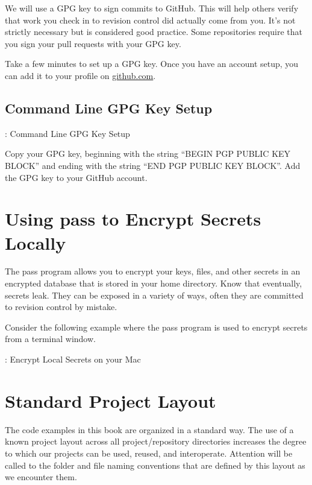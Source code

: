 \justify{}
We will use a GPG key to sign commits to GitHub. This will help others verify that work you check in to revision
control did actually come from you. It's not strictly necessary but is considered good practice.
Some repositories require that you sign your pull requests with your GPG key.

\justify{}
Take a few minutes to set up a GPG key. Once you have an account setup, you can add
it to your profile on \href{github.com}{github.com}.

\subsection{Command Line GPG Key Setup}

\begin{mybox}{\thetcbcounter: Command Line GPG Key Setup}

\end{mybox}

\justify{}
Copy your GPG key, beginning with the string ``BEGIN PGP PUBLIC KEY BLOCK'' and ending with the string
``END PGP PUBLIC KEY BLOCK''. Add the GPG key to your GitHub account.

\section{Using pass to Encrypt Secrets Locally}

\justify{}
The pass program allows you to encrypt your keys, files, and other secrets in an encrypted database that is
stored in your home directory. Know that eventually, secrets leak. They can be exposed in a variety of ways, 
often they are committed to revision control by mistake.

\justify{}
Consider the following example where the pass program is used to encrypt secrets from a terminal window.

\begin{mybox}{\thetcbcounter: Encrypt Local Secrets on your Mac}

\end{mybox}

\section{Standard Project Layout}

\justify{}
The code examples in this book are organized in a standard way. The use of a known project 
layout across all project/repository directories increases the degree to which our projects can be used, reused, and
interoperate. Attention will be called to the folder and file naming conventions that are defined by this layout
as we encounter them.

